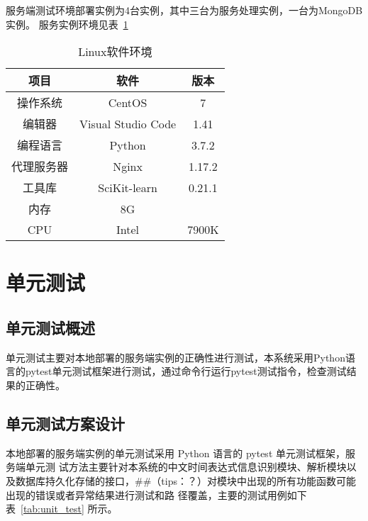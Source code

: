 服务端测试环境部署实例为4台实例，其中三台为服务处理实例，一台为MongoDB实例。 服务实例环境见表~\ref{tab:server_test}
\begin{table}[h]
    \centering
    \caption{Linux软件环境}
    \begin{tabular}{|*{3}{c|}}
        \hline
        项目       & 软件               & 版本   \\
        \hline
        操作系统   & CentOS             & 7      \\
        \hline
        编辑器     & Visual Studio Code & 1.41   \\
        编程语言   & Python             & 3.7.2  \\
        \hline
        代理服务器 & Nginx              & 1.17.2 \\
        \hline
        工具库     & SciKit-learn       & 0.21.1 \\
        \hline
        内存       & 8G                 &        \\
        \hline
        CPU        & Intel              & 7900K  \\
        \hline
    \end{tabular}
    \label{tab:server_test}
\end{table}


\section{单元测试}

\subsection{单元测试概述}

单元测试主要对本地部署的服务端实例的正确性进行测试，本系统采用Python语言的pytest单元测试框架进行测试，通过命令行运行pytest测试指令，检查测试结果的正确性。

\subsection{单元测试方案设计}


本地部署的服务端实例的单元测试采用 Python 语言的 pytest 单元测试框架，服务端单元测
试方法主要针对本系统的中文时间表达式信息识别模块、解析模块以及数据库持久化存储的接口，##（tips：？）对模块中出现的所有功能函数可能出现的错误或者异常结果进行测试和路
径覆盖，主要的测试用例如下表~\ref{tab:unit_test} 所示。

